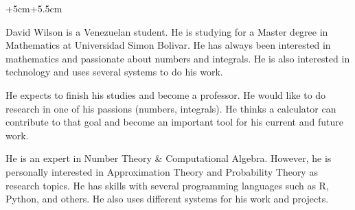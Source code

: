 \documentclass[../main.tex]{subfiles} %
\begin{document}
\begin{changemargin}{+5cm}{+5.5cm}

\aboutme{} %



\makeprofiles %



David Wilson is a Venezuelan student. He is studying for a Master degree in Mathematics at Universidad Simon Bolivar. He has always been interested in mathematics and passionate about numbers and integrals. He is also interested in technology and uses several systems to do his work. \newline


He expects to finish his studies and become a professor. He would like to do research in one of his passions (numbers, integrals). He thinks a calculator can contribute to that goal and become an important tool for his current and future work.\newline



He is an expert in Number Theory \& Computational Algebra. However, he is personally interested in Approximation Theory and Probability Theory as research topics. He has skills with several programming languages such as R, Python, and others. He also uses different systems for his work and projects.\newline


\end{changemargin}
\end{document}
